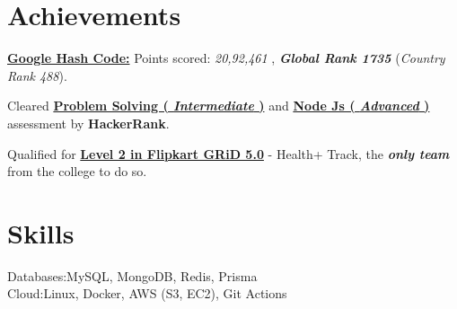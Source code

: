\documentclass[]{resume-openfont}
\begin{document}
\section{Achievements}
\begin{bullets}
    \item  \textbf{\href{https://drive.google.com/file/d/1PHLWF7olshOeVYCrIPq_-AS-QvxKBV9m/view?usp=sharing}{Google Hash Code:}} Points scored: \textit{20,92,461} , \textbf{\textit{ Global Rank 1735}} (\textit{Country Rank 488}).
    \item Cleared \textbf{\href{https://www.hackerrank.com/certificates/4099d9ae927f}{Problem Solving ( \textit{Intermediate} )}} and \textbf{\href{https://www.hackerrank.com/certificates/5ce743e1535f}{Node Js ( \textit{Advanced} )}} assessment by \textbf{HackerRank}.
    \item 
    Qualified for \textbf{\href{https://drive.google.com/file/d/1nG47kEjyQut83Ep9Tz-li2tB_1fTugOQ/view?usp=sharing}{Level 2 in Flipkart GRiD 5.0}} - Health+ Track, the \textbf{\textit{only team}} from the college to do so.
\end{bullets}
\sectionsep

\section{Skills}

\begin{skillList}
    {Databases:}{MySQL, MongoDB, Redis, Prisma}
    \\
    {Cloud:}{Linux, Docker, AWS (S3, EC2), Git Actions}%
    \\
    
\end{skillList}
\end{document}
